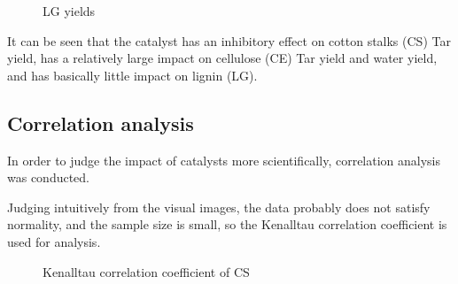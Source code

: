 \documentclass{swmcmthesis}
\begin{document}
\begin{figure}[h!t]
    \centering
    \hfill
    \caption{LG yields}
\end{figure}

It can be seen that the catalyst has an inhibitory effect on cotton stalks (CS) Tar yield, has a relatively large impact on cellulose (CE) Tar yield and water yield, and has basically little impact on lignin (LG).

\subsection{Correlation analysis}

In order to judge the impact of catalysts more scientifically, correlation analysis was conducted.

Judging intuitively from the visual images, the data probably does not satisfy normality, and the sample size is small, so the Kenalltau correlation coefficient is used for analysis.

\begin{figure}[h!t]
    \centering
    \hfill
    \caption{Kenalltau correlation coefficient of CS}
\end{figure}
\end{document}
